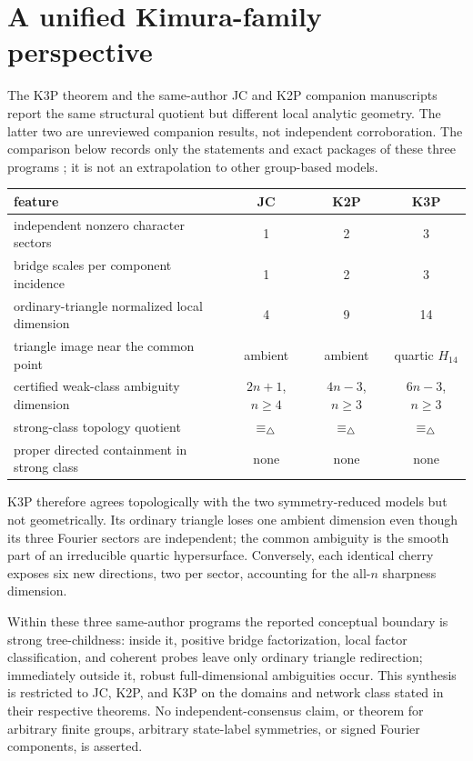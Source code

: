 \section{A unified Kimura-family perspective}\label{sec:kimura-perspective}

The K3P theorem and the same-author JC and K2P companion manuscripts report the
same structural quotient but different local analytic geometry.  The latter
two are unreviewed companion results, not independent corroboration.  The
comparison below records only the statements and exact packages of these
three programs \cite{KriebelJC2026,KriebelK2P2026}; it is not an extrapolation
to other group-based models.

\begin{center}
\small
\begin{tabular}{L{.29\linewidth}ccc}
\toprule
feature & JC & K2P & K3P\\
\midrule
independent nonzero character sectors & 1 & 2 & 3\\
bridge scales per component incidence & 1 & 2 & 3\\
ordinary-triangle normalized local dimension & 4 & 9 & 14\\
triangle image near the common point & ambient & ambient & quartic \(H_{14}\)\\
certified weak-class ambiguity dimension & \(2n+1\), \(n\ge4\) & \(4n-3\), \(n\ge3\) & \(6n-3\), \(n\ge3\)\\
strong-class topology quotient & \(\equiv_\triangle\) & \(\equiv_\triangle\) & \(\equiv_\triangle\)\\
proper directed containment in strong class & none & none & none\\
\bottomrule
\end{tabular}
\end{center}

K3P therefore agrees topologically with the two symmetry-reduced models but
not geometrically.  Its ordinary triangle loses one ambient dimension even
though its three Fourier sectors are independent; the common ambiguity is
the smooth part of an irreducible quartic hypersurface.  Conversely, each
identical cherry exposes six new directions, two per sector, accounting for
the all-\(n\) sharpness dimension.

Within these three same-author programs the reported conceptual boundary is
strong tree-childness: inside it, positive bridge factorization, local factor
classification, and coherent probes leave only ordinary triangle redirection;
immediately outside it, robust full-dimensional ambiguities occur.  This
synthesis is restricted to JC, K2P, and K3P on the domains and network class
stated in their respective theorems.  No independent-consensus claim, or
theorem for arbitrary finite groups, arbitrary state-label symmetries, or
signed Fourier components, is asserted.
